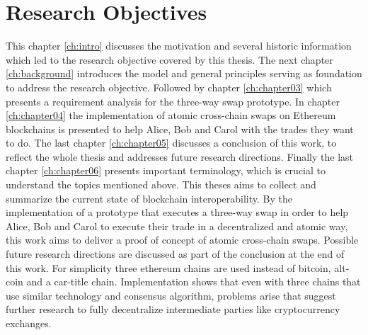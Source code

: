 \section{Research Objectives}
\label{sec:intro:goal}
This chapter \ref{ch:intro} discusses the motivation and several historic information which led to the research objective covered by this thesis. The next chapter \ref{ch:background} introduces the model and general principles serving as foundation to address the research objective. Followed by chapter \ref{ch:chapter03} which presents a requirement analysis for the three-way swap prototype. In chapter \ref{ch:chapter04} the implementation of atomic cross-chain swaps on Ethereum blockchains is presented to help Alice, Bob and Carol with the trades they want to do. The last chapter \ref{ch:chapter05} discusses a conclusion of this work, to reflect the whole thesis and addresses future research directions. Finally the last chapter \ref{ch:chapter06} presents important terminology, which is crucial to understand the topics mentioned above. This theses aims to collect and summarize the current state of blockchain interoperability. By the implementation of a prototype that executes a three-way swap in order to help Alice, Bob and Carol to execute their trade in a decentralized and atomic way, this work aims to deliver a proof of concept of atomic cross-chain swaps. Possible future research directions are discussed as part of the conclusion at the end of this work. For simplicity three ethereum chains are used instead of bitcoin, alt-coin and a car-title chain. Implementation shows that even with three chains that use similar technology and consensus algorithm, problems arise that suggest further research to fully decentralize intermediate parties like cryptocurrency exchanges.


